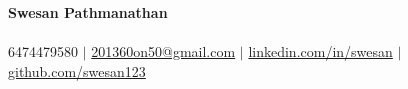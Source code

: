 \begin{center}
  {\fontsize{20pt}{20pt}\selectfont \textbf{Swesan Pathmanathan}} \\[-2pt]
  {} \\[2pt]
  \small
  6474479580 $|$
  \href{mailto:201360on50@gmail.com}{201360on50@gmail.com} $|$
  \href{https://www.linkedin.com/in/swesan}{linkedin.com/in/swesan} $|$
  \href{https://github.com/swesan123}{github.com/swesan123}
\end{center}
